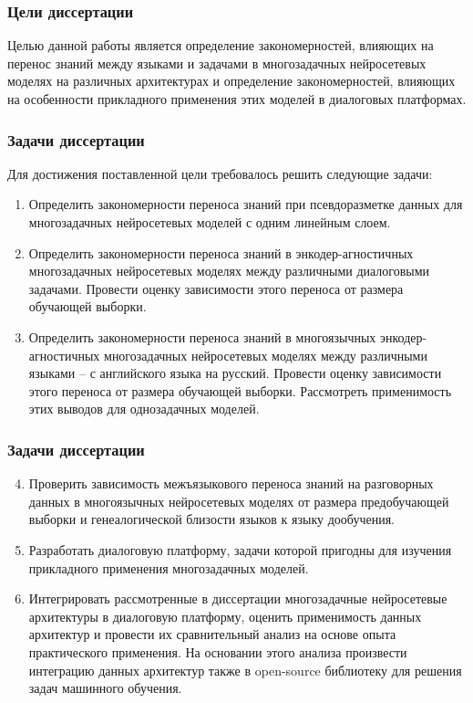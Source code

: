 \begin{frame}
    \setcounter{framenumber}{1}
    \maketitle
\end{frame}


\begin{frame}
    \frametitle{Цели диссертации}
Целью данной работы является определение закономерностей, влияющих на перенос знаний между языками и задачами в многозадачных нейросетевых моделях на различных архитектурах и определение закономерностей, влияющих на особенности прикладного применения этих моделей в диалоговых платформах.
\end{frame}

\begin{frame}
\frametitle{Задачи диссертации}
Для достижения поставленной цели требовалось решить следующие задачи:
\newline
\newline
\begin{enumerate}
  \item {Определить закономерности переноса знаний при псевдоразметке данных для многозадачных нейросетевых моделей с одним линейным слоем.}
  \item {Определить закономерности переноса знаний в энкодер-агностичных многозадачных нейросетевых моделях между различными диалоговыми задачами. Провести оценку зависимости этого переноса от размера обучающей выборки.}
  \item {Определить закономерности переноса знаний в многоязычных энкодер-агностичных многозадачных нейросетевых моделях между различными языками -- с английского языка на русский. Провести оценку зависимости этого переноса от размера обучающей выборки. Рассмотреть применимость этих выводов для однозадачных моделей.}
\end{enumerate}
\end{frame}

\begin{frame}
\frametitle{Задачи диссертации}
\begin{enumerate}
\setcounter{enumi}{3}
  \item {Проверить зависимость межъязыкового переноса знаний на разговорных данных в многоязычных нейросетевых моделях от размера предобучающей выборки и генеалогической близости языков к языку дообучения.}
  \item {Разработать диалоговую платформу, задачи которой пригодны для изучения прикладного применения многозадачных моделей.} %
  \item {Интегрировать рассмотренные в диссертации многозадачные нейросетевые архитектуры в диалоговую платформу, оценить применимость данных архитектур и провести их сравнительный анализ на основе опыта практического применения. На основании этого анализа произвести интеграцию данных архитектур также в open-source библиотеку для решения задач машинного обучения.}%
\end{enumerate}
\end{frame}


